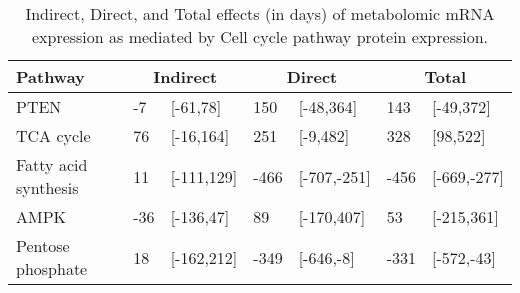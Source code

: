 \begin{table}[ht]
\centering
\begin{tabular}{lllllll}
  \hline
  Pathway & \multicolumn{2}{c}{Indirect} & \multicolumn{2}{c}{Direct}  & \multicolumn{2}{c}{Total} \\
 \hline
PTEN & -7 & [-61,78] & 150 & [-48,364] & 143 & [-49,372] \\ 
  TCA cycle & 76 & [-16,164] & 251 & [-9,482] & 328 & [98,522] \\ 
  Fatty acid synthesis & 11 & [-111,129] & -466 & [-707,-251] & -456 & [-669,-277] \\ 
  AMPK & -36 & [-136,47] & 89 & [-170,407] & 53 & [-215,361] \\ 
  Pentose phosphate & 18 & [-162,212] & -349 & [-646,-8] & -331 & [-572,-43] \\ 
   \hline
\end{tabular}
\caption{Indirect, Direct, and Total effects (in days) of metabolomic mRNA expression as mediated by Cell cycle pathway protein expression.} 
\end{table}

